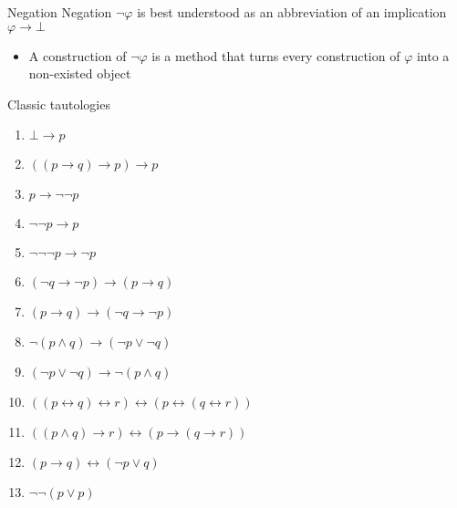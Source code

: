 \documentclass[sans]{beamer}
\begin{document}
\begin{frame}{Negation}
  Negation $\lnot \varphi$ is best understood as an abbreviation of an implication $\varphi \to \bot$

  \begin{itemize}
    \item A construction of $\lnot \varphi$ is a method that turns every construction of
      $\varphi$ into a non-existed object
  \end{itemize}
\end{frame}

\begin{frame}{Classic tautologies}
   \begin{enumerate}
     \item $\bot \to p$
     \item $((p \to q) \to p) \to p$
     \item $p \to \lnot \lnot p$
     \item $\lnot \lnot p \to p$
     \item $\lnot \lnot \lnot p \to \lnot p$
     \item $(\lnot q \to \lnot p) \to (p \to q)$
     \item $(p \to q) \to (\lnot q \to \lnot p)$
     \item $\lnot (p \wedge q) \to (\lnot p \vee \lnot q)$
     \item $(\lnot p \vee \lnot q) \to \lnot (p \wedge q)$
     \item $((p \leftrightarrow q) \leftrightarrow r) \leftrightarrow (p \leftrightarrow (q \leftrightarrow r))$
     \item $((p \wedge q) \to r) \leftrightarrow (p \to (q \to r))$
     \item $(p \to q) \leftrightarrow (\lnot p \vee q)$
     \item $\lnot\lnot (p \vee p)$
   \end{enumerate}
\end{frame}
\end{document}
